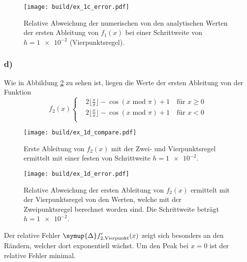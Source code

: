\begin{figure}
    \centering
    \texttt{[image: build/ex\_1c\_error.pdf]}
    \caption{Relative Abweichung der numerischen von den analytischen Werten der ersten Ableitung von $f_1(x)$
    bei einer Schrittweite von $h=\num{1e-2}$ (Vierpunktsregel).}
    \label{fig:rel_c}
\end{figure}
\FloatBarrier
\subsubsection*{d)}
Wie in Abbildung \ref{fig:d_comp} zu sehen ist, liegen 
die Werte der ersten Ableitung von der Funktion 
\begin{equation*}
    f_2(x)
    \begin{cases}
        & 2 \lfloor \frac{x}{\pi} \rfloor - \cos(x \text{ mod } \pi) + 1 \quad \text{für } x \geq 0 \\
        & 2 \lfloor \frac{x}{\pi} \rfloor - \cos(x \text{ mod } \pi) + 1 \quad \text{für } x < 0 \\
    \end{cases}
\end{equation*}
\begin{figure}
    \centering
    \texttt{[image: build/ex\_1d\_compare.pdf]}
    \caption{Erste Ableitung von $f_2(x)$ mit der Zwei- und Vierpunktsregel ermittelt mit einer festen von Schrittweite $h=\num{1e-2}$.}
    \label{fig:d_comp}
\end{figure}
\begin{figure}
    \centering
    \texttt{[image: build/ex\_1d\_error.pdf]}
    \caption{Relative Abweichung der ersten Ableitung von $f_2(x)$ ermittelt mit der Vierpunktsregel von 
    den Werten, welche mit der Zweipunktsregel berechnet worden sind.
    Die Schrittweite beträgt $h=\num{1e-2}$.}
    \label{fig:rel_d}
\end{figure}
Der relative Fehler $\symup{\Delta} f^{\prime}_{2, \text{Vierpunkt}}(x)$
zeigt sich besonders an den Rändern, welcher dort exponentiell wächst.
Um den Peak bei $x=0$ ist der relative Fehler minimal.